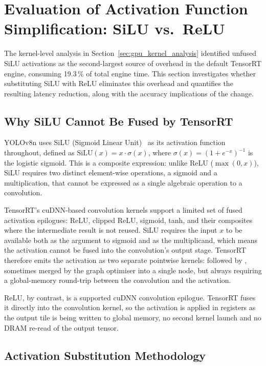 \documentclass[12pt,a4paper]{report}
\begin{document}
\section{Evaluation of Activation Function Simplification: SiLU vs.\ ReLU}
\label{sec:silu_relu}

The kernel-level analysis in Section~\ref{sec:gpu_kernel_analysis} identified unfused SiLU
activations as the second-largest source of overhead in the default TensorRT engine,
consuming 19.3\,\% of total engine time.
This section investigates whether substituting SiLU with ReLU eliminates this overhead
and quantifies the resulting latency reduction, along with the accuracy implications of
the change.

\subsection{Why SiLU Cannot Be Fused by TensorRT}

YOLOv8n uses SiLU (Sigmoid Linear Unit)~\cite{ramachandran2017swish} as its activation function
throughout, defined as $\text{SiLU}(x) = x \cdot \sigma(x)$, where
$\sigma(x) = (1 + e^{-x})^{-1}$ is the logistic sigmoid.
This is a composite expression: unlike ReLU ($\max(0, x)$), SiLU requires two distinct
element-wise operations, a sigmoid and a multiplication, that cannot be expressed as a single
algebraic operation to a convolution.

TensorRT's cuDNN-based convolution kernels support a limited set of fused activation
epilogues: ReLU, clipped ReLU, sigmoid, tanh, and their composites where the intermediate
result is not reused.
SiLU requires the input $x$ to be available both as the argument to sigmoid and as the
multiplicand, which means the activation cannot be fused into the convolution's output stage.
TensorRT therefore emits the activation as two separate pointwise kernels:
 followed by , sometimes merged by the graph optimiser into
a single  node, but always requiring a global-memory
round-trip between the convolution and the activation.

ReLU, by contrast, is a supported cuDNN convolution epilogue.
TensorRT fuses it directly into the convolution kernel, so the activation is applied
in registers as the output tile is being written to global memory, no second kernel
launch and no DRAM re-read of the output tensor.

\subsection{Activation Substitution Methodology}
\end{document}
